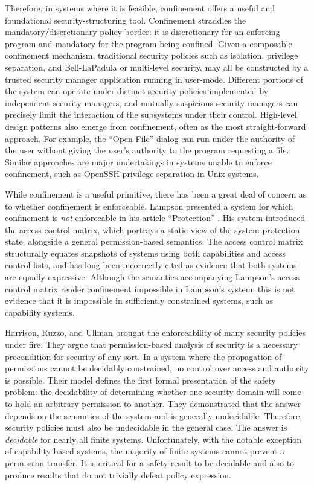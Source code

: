 Therefore, in systems where it is feasible, confinement offers a useful and foundational security-structuring tool.
Confinement straddles the mandatory/discretionary policy border: it is discretionary for an enforcing program and mandatory for the program being confined.
Given a composable confinement mechanism, traditional security policies such as isolation, privilege separation, and Bell-LaPadula or multi-level security, may all be constructed by a trusted security manager application running in user-mode. \cite{Miller03paradigmregained} 
Different portions of the system can operate under distinct security policies implemented by independent security managers, and mutually suspicious security managers can precisely limit the interaction of the subsystems under their control.
High-level design patterns also emerge from confinement, often as the most straight-forward approach.
For example, the ``Open File'' dialog can run under the authority of the user without giving the user's authority to the program requesting a file. \cite{StieglerMiller:DarpaBrowser}
Similar approaches are major undertakings in systems unable to enforce confinement, such as OpenSSH privilege separation in Unix systems. \cite{Provos:PrivSep}

While confinement is a useful primitive, there has been a great deal of concern as to whether confinement is enforceable.
Lampson presented a system for which confinement is \emph{not} enforceable in his article ``Protection'' \cite{Lampson:Protection}.
His system introduced the access control matrix, which portrays a static view of the system protection state, alongside a general permission-based semantics.
The access control matrix structurally equates snapshots of systems using both capabilities and access control lists, and has long been incorrectly cited as evidence that both systems are equally expressive.
Although the semantics accompanying Lampson's access control matrix render confinement impossible in Lampson's system, this is not evidence that it is impossible in sufficiently constrained systems, such as capability systems.

Harrison, Ruzzo, and Ullman brought the enforceability of many security policies under fire.\cite{HRU1976}
They argue that permission-based analysis of security is a necessary precondition for security of any sort.
In a system where the propagation of permissions cannot be decidably constrained, no control over access and authority is possible.
Their model defines the first formal presentation of the safety problem: the decidability of determining whether one security domain will come to hold an arbitrary permission to another.
They demonstrated that the answer depends on the semantics of the system and is generally undecidable.
Therefore, security policies must also be undecidable in the general case.
The answer is \emph{decidable} for nearly all finite systems.
Unfortunately, with the notable exception of capability-based systems, the majority of finite systems cannot prevent a permission transfer.
It is critical for a safety result to be decidable and also to produce results that do not trivially defeat policy expression.

